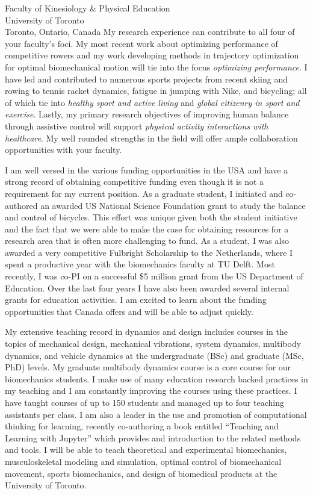 \documentclass{letter}
\begin{document}
\begin{letter}{
  Faculty of Kinesiology \& Physical Education \\
  University of Toronto \\
  Toronto, Ontario, Canada
}
My research experience can contribute to all four of your faculty's foci. My
most recent work about optimizing performance of competitive rowers and my work
developing methods in trajectory optimization for optimal biomechanical motion
will tie into the focus \emph{optimizing performance}. I have led and
contributed to numerous sports projects from recent skiing and rowing to tennis
racket dynamics, fatigue in jumping with Nike, and bicycling; all of which tie
into \emph{healthy sport and active living} and \emph{global citizenry in sport
and exercise}. Lastly, my primary research objectives of improving human
balance through assistive control will support \emph{physical activity
interactions with healthcare}. My well rounded strengths in the field will
offer ample collaboration opportunities with your faculty.

I am well versed in the various funding opportunities in the USA and have a
strong record of obtaining competitive funding even though it is not a
requirement for my current position. As a graduate student, I initiated and
co-authored an awarded US National Science Foundation grant to study the
balance and control of bicycles. This effort was unique given both the student
initiative and the fact that we were able to make the case for obtaining
resources for a research area that is often more challenging to fund. As a
student, I was also awarded a very competitive Fulbright Scholarship to the
Netherlands, where I spent a productive year with the biomechanics faculty at
TU Delft. Most recently, I was co-PI on a successful \$5 million grant from the
US Department of Education. Over the last four years I have also been awarded
several internal grants for education activities. I am excited to learn about
the funding opportunities that Canada offers and will be able to adjust
quickly.

My extensive teaching record in dynamics and design includes courses in the
topics of mechanical design, mechanical vibrations, system dynamics, multibody
dynamics, and vehicle dynamics at the undergraduate (BSc) and graduate (MSc,
PhD) levels. My graduate multibody dynamics course is a core course for our
biomechanics students. I make use of many education research backed practices
in my teaching and I am constantly improving the courses using these practices.
I have taught courses of up to 150 students and managed up to four teaching
assistants per class. I am also a leader in the use and promotion of
computational thinking for learning, recently co-authoring a book entitled
``Teaching and Learning with Jupyter'' which provides and introduction to the
related methods and tools. I will be able to teach theoretical and experimental
biomechanics, musculoskeletal modeling and simulation, optimal control of
biomechanical movement, sports biomechanics, and design of biomedical products
at the University of Toronto.


\end{letter}
\end{document}
